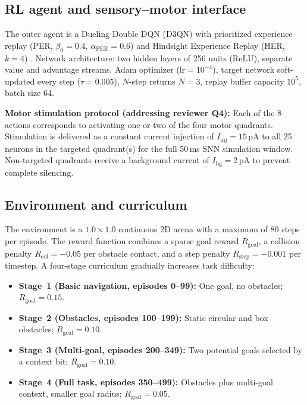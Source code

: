 \documentclass[journal,twocolumn]{IEEEtran}
\begin{document}
\subsection{RL agent and sensory--motor interface}

The outer agent is a Dueling Double DQN (D3QN) with prioritized
experience replay (PER, $\beta_{0}=0.4$, $\alpha_{\mathrm{PER}}=0.6$)
and Hindsight Experience Replay (HER, $k=4$)
\cite{Wang2016dueling,VanHasselt2016,Andrychowicz2017HER}.  Network
architecture: two hidden layers of 256 units (ReLU), separate value
and advantage streams, Adam optimizer ($\text{lr}=10^{-4}$), target
network soft-updated every step ($\tau = 0.005$), $N$-step returns
$N=3$, replay buffer capacity $10^{5}$, batch size 64.

\textbf{Motor stimulation protocol (addressing reviewer Q4):} Each of
the 8 actions corresponds to activating one or two of the four motor
quadrants.  Stimulation is delivered as a constant current injection
of $I_{\mathrm{inj}} = 15$\,pA to all 25 neurons in the targeted
quadrant(s) for the full 50\,ms SNN simulation window.  Non-targeted
quadrants receive a background current of $I_{\mathrm{bg}} = 2$\,pA
to prevent complete silencing.

\subsection{Environment and curriculum}

The environment is a $1.0 \times 1.0$ continuous 2D arena with a
maximum of 80 steps per episode.  The reward function combines a
sparse goal reward $R_{\mathrm{goal}}$, a collision penalty
$R_{\mathrm{col}} = -0.05$ per obstacle contact, and a step penalty
$R_{\mathrm{step}} = -0.001$ per timestep.  A four-stage curriculum
gradually increases task difficulty:
\begin{itemize}
\item \textbf{Stage~1 (Basic navigation, episodes 0--99):} One goal,
      no obstacles; $R_{\mathrm{goal}} = 0.15$.
\item \textbf{Stage~2 (Obstacles, episodes 100--199):} Static circular
      and box obstacles; $R_{\mathrm{goal}} = 0.10$.
\item \textbf{Stage~3 (Multi-goal, episodes 200--349):} Two potential
      goals selected by a context bit; $R_{\mathrm{goal}} = 0.10$.
\item \textbf{Stage~4 (Full task, episodes 350--499):} Obstacles plus
      multi-goal context, smaller goal radius; $R_{\mathrm{goal}} = 0.05$.
\end{itemize}
\end{document}

